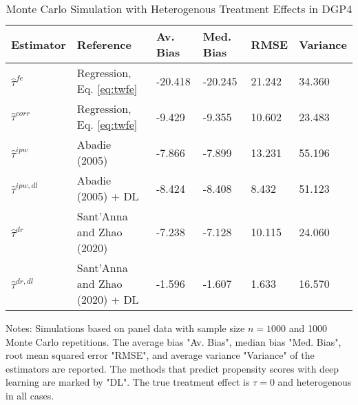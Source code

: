 \begin{table}[]
\centering
\begin{threeparttable}
\caption{Monte Carlo Simulation with Heterogenous Treatment Effects in DGP4}
\label{tab:table2}
\begin{tabular}{llllll}
\toprule
Estimator         & Reference                         & Av. Bias   & Med. Bias   & RMSE & Variance  \\ \midrule
\addlinespace
$\hat{\tau}^{fe}$ & Regression, Eq. \eqref{eq:twfe}               & -20.418      & -20.245        & 21.242 & 34.360      \\
$\hat{\tau}^{corr}$ & Regression, Eq. \eqref{eq:twfe}           & -9.429      & -9.355       & 10.602 & 23.483      \\
$\hat{\tau}^{ipw}$ & Abadie (2005)                    & -7.866       & -7.899       & 13.231 & 55.196      \\
$\hat{\tau}^{ipw,dl}$ & Abadie (2005) + DL            & -8.424       & -8.408        & 8.432 & 51.123      \\
$\hat{\tau}^{dr}$ & Sant'Anna and Zhao (2020)         & -7.238      & -7.128        & 10.115 & 24.060      \\
$\hat{\tau}^{dr,dl}$ & Sant'Anna and Zhao (2020) + DL & -1.596       & -1.607        & 1.633 & 16.570      \\

\bottomrule
\end{tabular}
\begin{tablenotes}
    \item Notes: Simulations based on panel data with sample size $n = 1000$ and 1000 Monte Carlo repetitions. The average bias "Av. Bias", median bias "Med. Bias", root mean squared error "RMSE", and average variance "Variance" of the estimators are reported. The methods that predict propensity scores with deep learning are marked by "DL". The true treatment effect is $\tau = 0$ and heterogenous in all cases.

\end{tablenotes}
\end{threeparttable}
\end{table}
